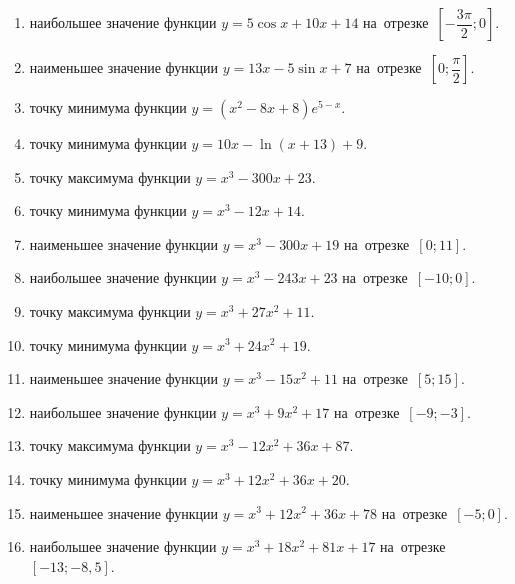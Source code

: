 \documentclass[a4paper,10pt]{article}
\begin{document}
\begin{enumerate}
\item {} наибольшее значение функции $y=5\cos x+10x +14$ на~отрезке~$\left[-\dfrac{3\pi }{2};0\right]$.

\item {} наименьшее значение функции $y=13x-5\sin x +7$ на~отрезке~$\left[0;\dfrac{\pi }{2}\right]$.

\item {} точку минимума функции $y=\left(x^2-8x+8\right){{e}^{5-x}}$.

\item {} точку минимума функции $y=10x-\ln \left(x+13\right)+9$.

\item {} точку максимума функции $y=x^3 -300x +23$.

\item {} точку минимума функции $y=x^3 -12x+14$.

\item {} наименьшее значение функции $y=x^3 -300x+19$ на~отрезке~$\left[0;11\right]$.

\item {} наибольшее значение функции $y=x^3 -243x+23$ на~отрезке~$\left[-10;0\right]$.

\item {} точку максимума функции $y=x^3 +27x^2+11$.

\item {} точку минимума функции $y=x^3 +24x^2+19$.

\item {} наименьшее значение функции $y=x^3 -15x^2+11$ на~отрезке~$\left[5;15\right]$.

\item {} наибольшее значение функции $y=x^3 +9x^2+17$ на~отрезке~$\left[-9;-3\right]$.

\item {} точку максимума функции $y=x^3 -12x^2+36x+87$.

\item {} точку минимума функции $y=x^3 +12x^2+36x+20$.

\item {} наименьшее значение функции $y=x^3 +12x^2+36x+78$ на~отрезке~$\left[-5;0\right]$.

\item {} наибольшее значение функции $y=x^3 +18x^2+81x+17$ на~отрезке~$\left[-13;-8,5\right]$.


\end{enumerate}
\end{document}

